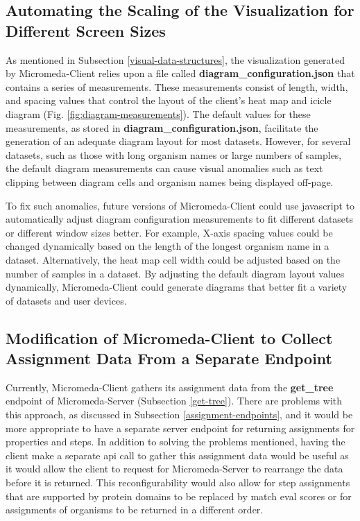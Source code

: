 \subsection{Automating the Scaling of the Visualization for Different Screen 
Sizes}

As mentioned in Subsection \ref{visual-data-structures}, the visualization 
generated by Micromeda-Client relies upon a file called 
\textbf{diagram\_configuration.json} that contains a series of measurements. 
These measurements consist of length, width, and spacing values that control the 
layout of the client's heat map and icicle diagram (Fig. 
\ref{fig:diagram-measurements}). The default values for these measurements, as 
stored in \textbf{diagram\_configuration.json}, facilitate the generation of an 
adequate diagram layout for most datasets. However, for several datasets, such 
as those with long organism names or large numbers of samples, the default 
diagram measurements can cause visual anomalies such as text clipping between 
diagram cells and organism names being displayed off-page.

To fix such anomalies, future versions of Micromeda-Client could use 
\gls{javascript} to automatically adjust diagram configuration measurements to 
fit different datasets or different window sizes better. For example, X-axis 
spacing values could be changed dynamically based on the length of the longest 
organism name in a dataset. Alternatively, the heat map cell width could be 
adjusted based on the number of samples in a dataset. By adjusting the default 
diagram layout values dynamically, Micromeda-Client could generate diagrams that 
better fit a variety of datasets and user devices.

\subsection{Modification of Micromeda-Client to Collect Assignment Data From a 
Separate Endpoint}

Currently, Micromeda-Client gathers its assignment data from the 
\textbf{get\_tree} endpoint of Micromeda-Server (Subsection \ref{get-tree}). 
There are problems with this approach, as discussed in Subsection 
\ref{assignment-endpoints}, and it would be more appropriate to have a separate 
server endpoint for returning assignments for properties and steps. In addition 
to solving the problems mentioned, having the client make a separate \gls{api} 
call to gather this assignment data would be useful as it would allow the client 
to request for Micromeda-Server to rearrange the data before it is returned. 
This reconfigurability would also allow for step assignments that are supported 
by protein domains to be replaced by match \gls{eval} scores or for assignments 
of organisms to be returned in a different order.

